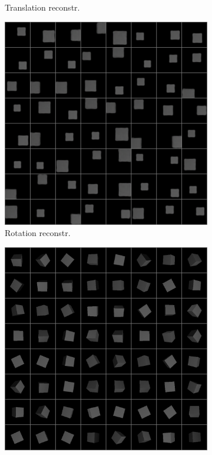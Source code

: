 \documentclass[10pt,a4paper]{article}
\begin{document}
\begin{figure}[!ht]
\begin{subfigure}{0.49\textwidth}
        \caption{Translation reconstr.}
        \label{cube_trec}
    \end{subfigure}
    \begin{subfigure}{0.49\textwidth}
        \centering	
        \includegraphics[width=\textwidth]{cube_output1.png}
        \caption{Rotation reconstr.}
        \label{cube_rrec}
    \end{subfigure}
    \begin{subfigure}{0.49\textwidth}
        \centering
        \includegraphics[width=\textwidth] {cube_target0.png}

\end{subfigure}
\end{figure}
\end{document}
